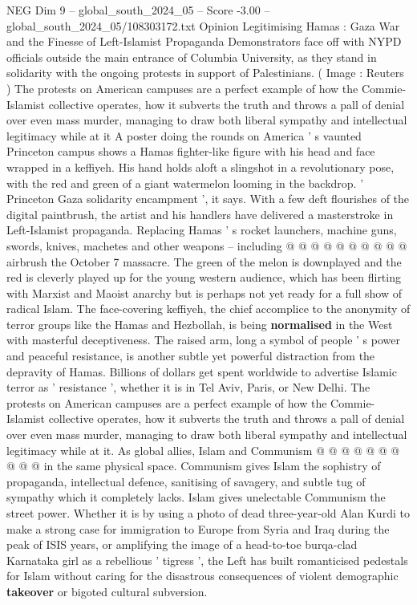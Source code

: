 \begin{textsample}{NEG Dim 9 – global\_south\_2024\_05 – Score -3.00 – global\_south\_2024\_05/108303172.txt}  \label{ex:f9_neg_326}
Opinion Legitimising Hamas : Gaza War and the Finesse of Left-Islamist Propaganda Demonstrators face off with NYPD officials outside the main entrance of Columbia University, as they stand in solidarity with the ongoing protests in support of Palestinians. ( Image : Reuters ) The protests on American campuses are a perfect example of how the Commie-Islamist collective operates, how it subverts the truth and throws a pall of denial over even mass murder, managing to draw both liberal sympathy and intellectual legitimacy while at it A poster doing the rounds on America ' s vaunted Princeton campus shows a Hamas fighter-like figure with his head and face wrapped in a keffiyeh.
His hand holds aloft a slingshot in a revolutionary pose, with the red and green of a giant watermelon looming in the backdrop. ' Princeton Gaza solidarity encampment ', it says.
With a few deft flourishes of the digital paintbrush, the artist and his handlers have delivered a masterstroke in Left-Islamist propaganda.
Replacing Hamas ' s rocket launchers, machine guns, swords, knives, machetes and other weapons -- including @ @ @ @ @ @ @ @ @ @ airbrush the October 7 massacre.
The green of the melon is downplayed and the red is cleverly played up for the young western audience, which has been flirting with Marxist and Maoist anarchy but is perhaps not yet ready for a full show of radical Islam.
The face-covering keffiyeh, the chief accomplice to the anonymity of terror groups like the Hamas and Hezbollah, is being \textbf{normalised} in the West with masterful deceptiveness.
The raised arm, long a symbol of people ' s power and peaceful resistance, is another subtle yet powerful distraction from the depravity of Hamas.
Billions of dollars get spent worldwide to advertise Islamic terror as ' resistance ', whether it is in Tel Aviv, Paris, or New Delhi.
The protests on American campuses are a perfect example of how the Commie-Islamist collective operates, how it subverts the truth and throws a pall of denial over even mass murder, managing to draw both liberal sympathy and intellectual legitimacy while at it.
As global allies, Islam and Communism @ @ @ @ @ @ @ @ @ @ in the same physical space.
Communism gives Islam the sophistry of propaganda, intellectual defence, sanitising of savagery, and subtle tug of sympathy which it completely lacks.
Islam gives unelectable Communism the street power.
Whether it is by using a photo of dead three-year-old Alan Kurdi to make a strong case for immigration to Europe from Syria and Iraq during the peak of ISIS years, or amplifying the image of a head-to-toe burqa-clad Karnataka girl as a rebellious ' tigress ', the Left has built romanticised pedestals for Islam without caring for the disastrous consequences of violent demographic \textbf{takeover} or bigoted cultural subversion.

\end{textsample}
